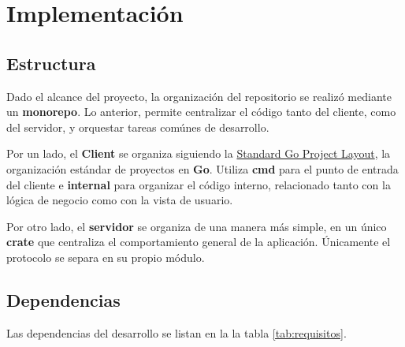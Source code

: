 \section{Implementación}

\subsection*{Estructura}

Dado el alcance del proyecto, la organización del repositorio se realizó mediante un \textbf{monorepo}. Lo anterior,
permite centralizar el código tanto del cliente, como del servidor, y orquestar tareas comúnes de desarrollo.


Por un lado, el \textbf{Client} se organiza siguiendo la
\href{https://github.com/golang-standards/project-layout/blob/master/README_es.md}{Standard Go
Project Layout}, la organización estándar de proyectos en \textbf{Go}. Utiliza \textbf{cmd} para
el punto de entrada del cliente e \textbf{internal} para organizar el código interno, relacionado
tanto con la lógica de negocio como con la vista de usuario.

Por otro lado, el \textbf{servidor} se organiza de una manera más simple, en un único
\textbf{crate} que centraliza el comportamiento general de la aplicación. Únicamente el protocolo
se separa en su propio módulo.

\subsection*{Dependencias}

Las dependencias del desarrollo se listan en la la tabla \ref*{tab:requisitos}.

